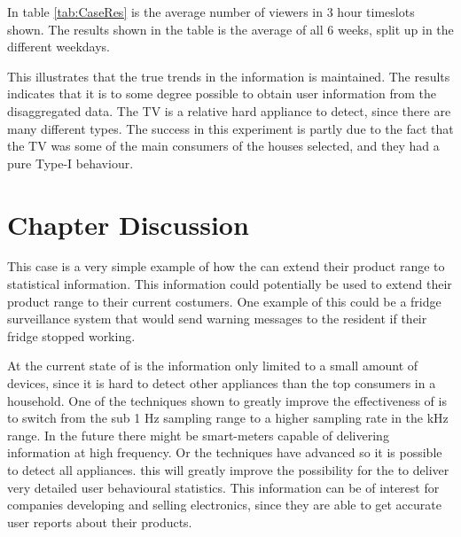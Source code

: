 In table \ref{tab:CaseRes} is the average number of viewers in 3 hour timeslots shown. The results shown in the table is the average of all 6 weeks, split up in the different weekdays. 



This illustrates that the true trends in the information is maintained. The results indicates that it is to some degree possible to obtain user information from the disaggregated data. The TV is a relative hard appliance to detect, since there are many different types. The success in this experiment is partly due to the fact that the TV was some of the main consumers of the houses selected, and they had a pure Type-I behaviour.

\section{Chapter Discussion}
This case is a very simple example of how the  can extend their product range to statistical information. This information could potentially be used to extend their product range to their current costumers. One example of this could be a fridge surveillance system that would send warning messages to the resident if their fridge stopped working.

At the current state of  is the information only limited to a small amount of devices, since it is hard to detect other appliances than the top consumers in a household. One of the techniques shown to greatly improve the effectiveness of  is to switch from the sub 1 Hz sampling range to a higher sampling rate in the kHz range. In the future there might be smart-meters capable of delivering information at high frequency. Or the  techniques have advanced so it is possible to detect all appliances. this will greatly improve the possibility for the  to deliver very detailed user behavioural statistics. This information can be of interest for companies developing and selling electronics, since they are able to get accurate user reports about their products. 

